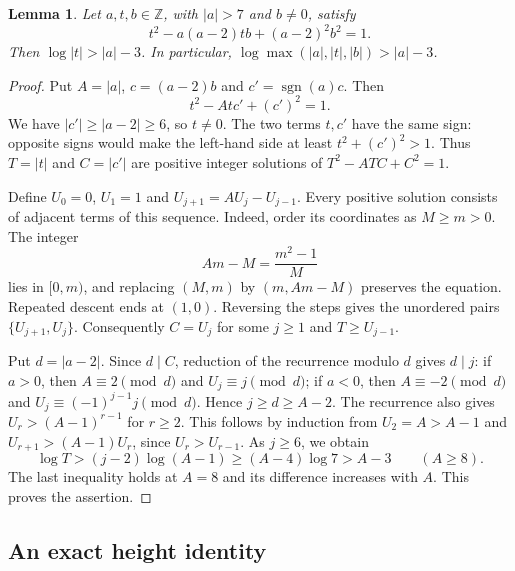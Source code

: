 \documentclass[11pt,a4paper]{article}
\newtheorem{lemma}[theorem]{Lemma}
\theoremstyle{definition}
\theoremstyle{remark}
\begin{document}
\begin{lemma}\label{lem:lucas-growth-elementary}
Let $a,t,b\in\mathbb Z$, with $|a|>7$ and $b\ne0$, satisfy
\[
 t^2-a(a-2)tb+(a-2)^2b^2=1.
\]
Then $\log|t|>|a|-3$. In particular,
$\log\max(|a|,|t|,|b|)>|a|-3$.
\end{lemma}
\begin{proof}
Put $A=|a|$, $c=(a-2)b$ and $c'=\operatorname{sgn}(a)c$.
Then
\[
                       t^2-Atc'+(c')^2=1.
\]
We have $|c'|\ge|a-2|\ge6$, so $t\ne0$. The two terms $t,c'$
have the same sign: opposite signs would make the left-hand side
at least $t^2+(c')^2>1$. Thus $T=|t|$ and $C=|c'|$ are positive
integer solutions of $T^2-ATC+C^2=1$.

Define $U_0=0$, $U_1=1$ and $U_{j+1}=AU_j-U_{j-1}$.
Every positive solution consists of adjacent terms of this sequence.
Indeed, order its coordinates as $M\ge m>0$. The integer
\[
                     Am-M=\frac{m^2-1}{M}
\]
lies in $[0,m)$, and replacing $(M,m)$ by $(m,Am-M)$ preserves
the equation. Repeated descent ends at $(1,0)$. Reversing the
steps gives the unordered pairs $\{U_{j+1},U_j\}$. Consequently
$C=U_j$ for some $j\ge1$ and $T\ge U_{j-1}$.

Put $d=|a-2|$. Since $d\mid C$, reduction of the recurrence
modulo $d$ gives $d\mid j$: if $a>0$, then $A\equiv2\pmod d$
and $U_j\equiv j\pmod d$; if $a<0$, then $A\equiv-2\pmod d$
and $U_j\equiv(-1)^{j-1}j\pmod d$. Hence $j\ge d\ge A-2$.
The recurrence also gives $U_r>(A-1)^{r-1}$ for $r\ge2$.
This follows by induction from $U_2=A>A-1$ and
$U_{r+1}>(A-1)U_r$, since $U_r>U_{r-1}$.
As $j\ge6$, we obtain
\[
 \log T>(j-2)\log(A-1)\ge(A-4)\log7>A-3
 \qquad(A\ge8).
\]
The last inequality holds at $A=8$ and its difference increases
with $A$. This proves the assertion.
\end{proof}


\subsection{An exact height identity}
\end{document}
